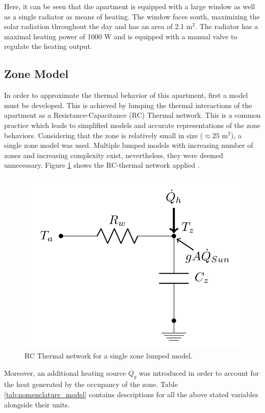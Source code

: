 Here, it can be seen that the apartment is equipped with a large window as well as a single radiator as means of heating. The window faces south, maximizing the solar radiation throughout the day and has an area of 2.1 m$^2$. The radiator has a maximal heating power of 1000 W and is equipped with a manual valve to regulate the heating output.

\subsection{Zone Model}
\label{subsec:zone_model}
In order to approximate the thermal behavior of this apartment, first a model must be developed. This is achieved by lumping the thermal interactions of the apartment as a Resistance-Capacitance (RC) Thermal network. This is a common practice which leads to simplified models and accurate representations of the zone behaviors. Considering that the zone is relatively small in size ($\approx25$ m$^2$), a single zone model was used. Multiple lumped models with increasing number of zones and increasing complexity exist, nevertheless, they were deemed unnecessary. Figure \ref{fig:single_zone} shows the RC-thermal network applied \cite{drgovna2020all}.

\begin{figure}[H]
\centering
\includegraphics[scale=0.5]{images/single_zone.png}
\caption{RC Thermal network for a single zone lumped model.}
\label{fig:single_zone}
\end{figure}

Moreover, an additional heating source $\dot{Q_g}$ was introduced in order to account for the heat generated by the occupancy of the zone. Table \ref{tab:nomenclature_model} contains descriptions for all the above stated variables alongside their units.

